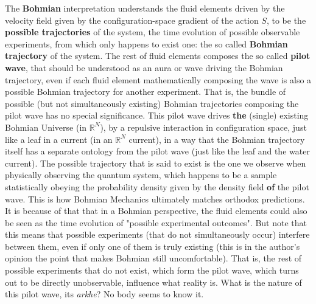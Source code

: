 \documentclass[11pt, a4paper]{article} %
\newcommand{\R}{\mathbb{R}} %
\begin{document}
The {\bf Bohmian} interpretation understands the fluid elements driven by the velocity field given by the configuration-space gradient of the action $S$, to be the {\bf possible trajectories} of the system, the time evolution of possible observable experiments, from which only happens to exist one: the so called {\bf Bohmian trajectory} of the system. The rest of fluid elements composes the so called {\bf pilot wave}, that should be understood as an aura or wave driving the Bohmian trajectory, even if each fluid element mathematically composing the wave is also a possible Bohmian trajectory for another experiment. That is, the bundle of possible (but not simultaneously existing) Bohmian trajectories composing the pilot wave has no special significance. This pilot wave drives {\bf the} (single) existing Bohmian Universe (in $\R^N$), by a repulsive interaction in configuration space, just like a leaf in a current (in an $\R^N$ current), in a way that the Bohmian trajectory itself has a separate ontology from the pilot wave (just like the leaf and the water current). The possible trajectory that is said to exist is the one we observe when physically observing the quantum system, which happens to be a sample statistically obeying the probability density given by the density field {\bf of} the pilot wave. This is how Bohmian Mechanics ultimately matches orthodox predictions. It is because of that that in a Bohmian perspective, the fluid elements could also be seen as the time evolution of "possible experimental outcomes". But note that this means that possible experiments (that do not simultaneously occur) interfere between them, even if only one of them is truly existing (this is in the author's opinion the point that makes Bohmian still uncomfortable). That is, the rest of possible experiments that do not exist, which form the pilot wave, which turns out to be directly unobservable, influence what reality is. What is the nature of this pilot wave, its {\em arkhe}? No body seems to know it.
\end{document}
